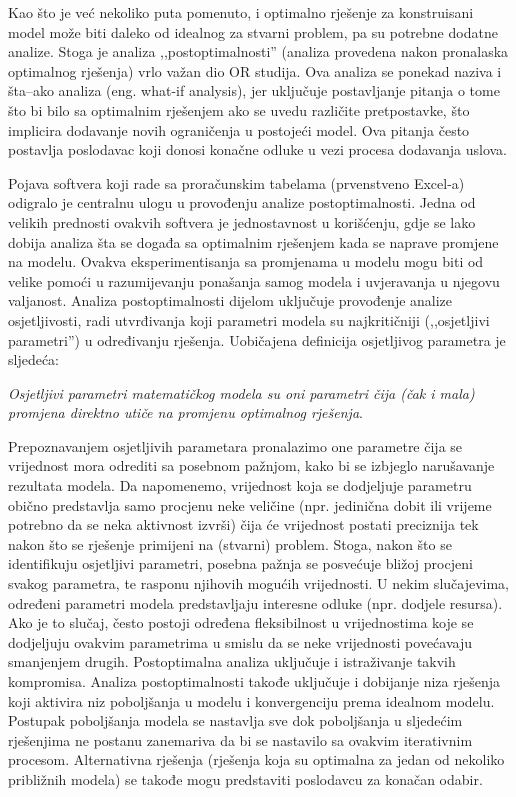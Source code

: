 \documentclass[a4paper, utf8, 11pt, colorlinks]{book}
\theoremstyle{definition}
\begin{document}
Kao što je već nekoliko puta pomenuto,  i optimalno rješenje za konstruisani model može biti daleko od idealnog za stvarni problem, pa su potrebne dodatne analize. Stoga je analiza ,,postoptimalnosti'' (analiza provedena nakon pronalaska optimalnog rješenja) vrlo važan dio OR studija.  Ova analiza se ponekad naziva i šta--ako analiza (eng. what-if analysis), jer uključuje postavljanje pitanja o tome što bi bilo sa optimalnim rješenjem ako se uvedu različite pretpostavke, što implicira dodavanje novih ograničenja u postojeći model. Ova pitanja često postavlja poslodavac koji donosi konačne odluke u vezi procesa dodavanja uslova. %

Pojava softvera koji rade sa proračunskim tabelama (prvenstveno Excel-a) odigralo je centralnu ulogu u provođenju analize postoptimalnosti. Jedna od velikih prednosti ovakvih softvera je jednostavnost u korišćenju, gdje se lako dobija analiza šta se događa sa optimalnim rješenjem kada se naprave promjene na modelu.  Ovakva eksperimentisanja sa promjenama u modelu mogu biti od velike pomoći u razumijevanju ponašanja samog modela i uvjeravanja u njegovu valjanost.  Analiza postoptimalnosti dijelom  uključuje provođenje analize osjetljivosti, radi utvrđivanja koji parametri modela su najkritičniji (,,osjetljivi parametri'') u određivanju rješenja. Uobičajena definicija osjetljivog parametra je sljedeća:

\emph{Osjetljivi parametri matematičkog modela su oni parametri čija (čak i mala) promjena direktno utiče na promjenu optimalnog rješenja}.


Prepoznavanjem osjetljivih parametara pronalazimo one parametre čija se vrijednost mora odrediti sa posebnom pažnjom, kako bi se izbjeglo narušavanje rezultata modela. Da napomenemo, vrijednost koja se dodjeljuje parametru obično predstavlja samo procjenu neke veličine
(npr. jedinična dobit ili vrijeme potrebno da se neka aktivnost izvrši) čija će vrijednost postati preciznija tek nakon što se rješenje primijeni na (stvarni) problem. Stoga, nakon što se identifikuju osjetljivi parametri, posebna pažnja se posvećuje bližoj procjeni svakog parametra, te  rasponu njihovih mogućih vrijednosti.  U nekim slučajevima, određeni parametri modela predstavljaju interesne odluke (npr. dodjele resursa). Ako je to slučaj, često postoji određena fleksibilnost u vrijednostima koje se dodjeljuju ovakvim parametrima u smislu da se neke vrijednosti povećavaju smanjenjem drugih. Postoptimalna analiza uključuje i istraživanje takvih kompromisa. Analiza postoptimalnosti takođe uključuje i dobijanje niza rješenja koji aktivira niz poboljšanja u modelu i konvergenciju prema idealnom modelu. Postupak poboljšanja modela se nastavlja sve dok    poboljšanja u sljedećim rješenjima ne postanu zanemariva da bi se nastavilo sa ovakvim iterativnim procesom.   Alternativna rješenja (rješenja koja su optimalna za jedan od nekoliko približnih modela) se takođe mogu predstaviti poslodavcu za konačan odabir. 
\end{document}
